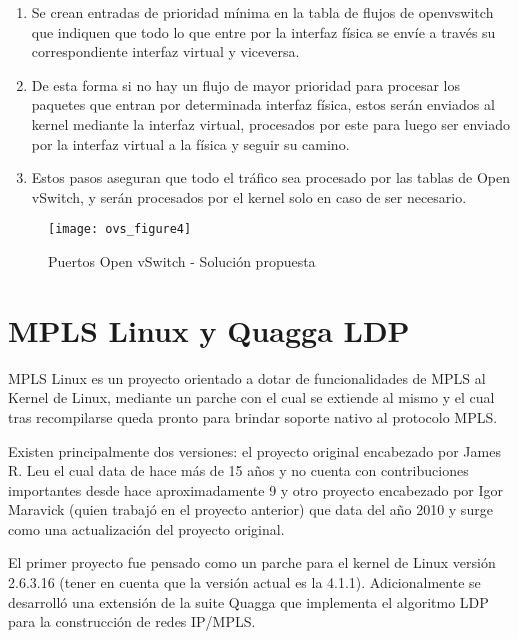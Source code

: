 \begin{enumerate}
\begin{enumerate}
\item Se crean entradas de prioridad mínima en la tabla de flujos de openvswitch que indiquen que todo lo que entre por la interfaz física se envíe a través su correspondiente interfaz virtual y viceversa.

\item De esta forma si no hay un flujo de mayor prioridad para procesar los paquetes que entran por determinada interfaz física, estos serán enviados al kernel mediante la interfaz virtual, procesados por este para luego ser enviado por la interfaz virtual a la física y seguir su camino.

\item Estos pasos aseguran que todo el tráfico sea procesado por las tablas de Open vSwitch, y serán procesados por el kernel solo en caso de ser necesario.
\end{enumerate}

\begin{figure}[h!] 
\centering    
\texttt{[image: ovs\_figure4]}
\caption[Puertos Open vSwitch - Soluci\'on propuesta]{Puertos Open vSwitch - Soluci\'on propuesta}
\label{fig:OVSInterfaces2}
\end{figure}

\end{enumerate}

\section{MPLS Linux y Quagga LDP}
\label{apendiceB6}

MPLS Linux es un proyecto orientado a dotar de funcionalidades de MPLS al Kernel de Linux, mediante un parche con el cual se extiende al mismo y el cual tras recompilarse queda pronto para brindar soporte nativo al protocolo MPLS.

Existen principalmente dos versiones: el proyecto original\cite{MplsLinux1} encabezado por James R. Leu el cual data de hace m\'as de 15 a\~nos y no cuenta con contribuciones importantes desde hace aproximadamente 9 y otro proyecto\cite{MplsLinux2} encabezado por Igor Maravick (quien trabaj\'o en el proyecto anterior) que data del a\~no 2010 y surge como una actualizaci\'on del proyecto original.

El primer proyecto fue pensado como un parche para el kernel de Linux versi\'on 2.6.3.16 (tener en cuenta que la versi\'on actual es la 4.1.1). Adicionalmente se desarroll\'o una extensión de la suite Quagga\cite{QuaggaLDP1} que implementa el algoritmo LDP para la construcci\'on de redes IP/MPLS.

